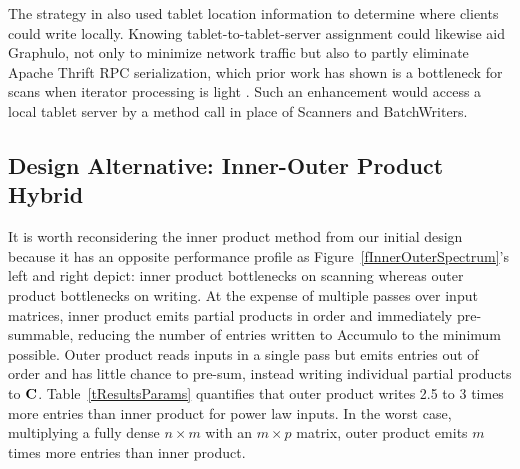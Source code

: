 The strategy in \cite{kepner2014achieving} 
also used %
tablet location information
to determine where clients could write locally.
Knowing tablet-to-tablet-server assignment could likewise aid Graphulo, 
not only to minimize network traffic
but also
 to partly eliminate Apache Thrift RPC serialization,
which prior work has shown is a bottleneck for scans %
when iterator processing is light \cite{sawyer2013understanding}.
Such an enhancement would access a local tablet server by a method call 
in place of Scanners and BatchWriters.


\subsection{Design Alternative: Inner-Outer Product Hybrid}

It is worth reconsidering the inner product method from our initial design
because it has an opposite performance profile as 
Figure~\ref{fInnerOuterSpectrum}'s left and right depict: 
inner product bottlenecks on scanning whereas outer product bottlenecks on writing.
At the expense of multiple passes over input matrices, inner product emits 
partial products in order and immediately pre-summable,
reducing the number of entries written to Accumulo to the minimum possible.
Outer product reads inputs in a single pass
but emits entries out of order and has little chance to pre-sum, 
instead writing individual partial products to $\mathbf{C}$.
Table~\ref{tResultsParams} quantifies that outer product writes
2.5 to 3 times more entries than inner product for power law inputs.
In the worst case, multiplying a fully dense $n \times m$ with an $m \times p$ matrix,
outer product emits $m$ times more entries than inner product.




